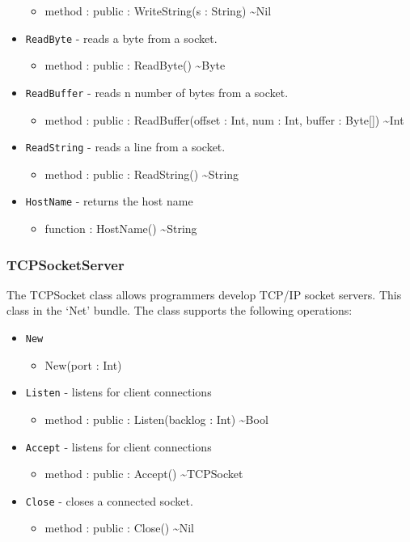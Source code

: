 \documentclass[11pt]{article}
\begin{document}
\begin{itemize}
  \begin{itemize}
  \item method : public : WriteString(s : String) \textasciitilde Nil
  \end{itemize}
\item \texttt{ReadByte} - reads a byte from a socket.
  \begin{itemize}
  \item method : public : ReadByte() \textasciitilde Byte
  \end{itemize}
\item \texttt{ReadBuffer} - reads n number of bytes from a socket.
  \begin{itemize}
  \item method : public : ReadBuffer(offset : Int, num : Int, buffer :
    Byte[]) \textasciitilde Int
  \end{itemize}
\item \texttt{ReadString} - reads a line from a socket.
  \begin{itemize}
  \item method : public : ReadString() \textasciitilde String
  \end{itemize}
\item \texttt{HostName} - returns the host name
  \begin{itemize}
  \item function : HostName() \textasciitilde String
  \end{itemize}
\end{itemize}

\subsubsection{TCPSocketServer}
The TCPSocket class allows programmers develop TCP/IP socket servers. This class in the `Net' bundle.  The class supports the following operations:
\begin{itemize}
\item \texttt{New}
  \begin{itemize}
  \item New(port : Int)
  \end{itemize}
\item \texttt{Listen} - listens for client connections
  \begin{itemize}
  \item method : public : Listen(backlog : Int) \textasciitilde Bool
  \end{itemize}
\item \texttt{Accept} - listens for client connections
  \begin{itemize}
  \item method : public : Accept() \textasciitilde TCPSocket
  \end{itemize}
\item \texttt{Close} - closes a connected socket.
  \begin{itemize}
  \item method : public : Close() \textasciitilde Nil
  \end{itemize}
\end{itemize}
\end{document}

